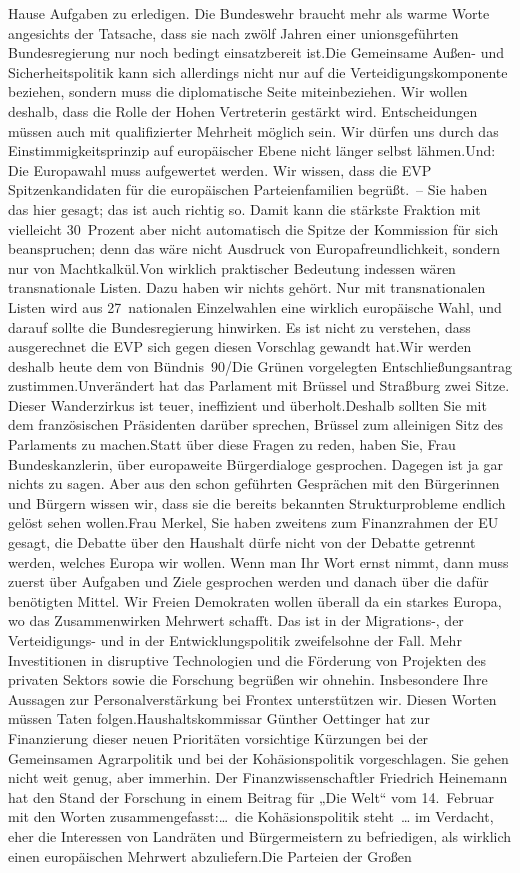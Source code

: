 \documentclass{article}
\begin{document}
Hause Aufgaben zu erledigen. Die Bundeswehr braucht mehr als warme Worte angesichts der Tatsache, dass sie nach zwölf Jahren einer unionsgeführten Bundesregierung nur noch bedingt einsatzbereit ist.Die Gemeinsame Außen- und Sicherheitspolitik kann sich allerdings nicht nur auf die Verteidigungskomponente beziehen, sondern muss die diplomatische Seite miteinbeziehen. Wir wollen deshalb, dass die Rolle der Hohen Vertreterin gestärkt wird. Entscheidungen müssen auch mit qualifizierter Mehrheit möglich sein. Wir dürfen uns durch das Einstimmigkeitsprinzip auf europäischer Ebene nicht länger selbst lähmen.Und: Die Europawahl muss aufgewertet werden. Wir wissen, dass die EVP Spitzenkandidaten für die europäischen Parteienfamilien begrüßt. – Sie haben das hier gesagt; das ist auch richtig so. Damit kann die stärkste Fraktion mit vielleicht 30 Prozent aber nicht automatisch die Spitze der Kommission für sich beanspruchen; denn das wäre nicht Ausdruck von Europafreundlichkeit, sondern nur von Machtkalkül.Von wirklich praktischer Bedeutung indessen wären transnationale Listen. Dazu haben wir nichts gehört. Nur mit transnationalen Listen wird aus 27 nationalen Einzelwahlen eine wirklich europäische Wahl, und darauf sollte die Bundesregierung hinwirken. Es ist nicht zu verstehen, dass ausgerechnet die EVP sich gegen diesen Vorschlag gewandt hat.Wir werden deshalb heute dem von Bündnis 90/Die Grünen vorgelegten Entschließungsantrag zustimmen.Unverändert hat das Parlament mit Brüssel und Straßburg zwei Sitze. Dieser Wanderzirkus ist teuer, ineffizient und überholt.Deshalb sollten Sie mit dem französischen Präsidenten darüber sprechen, Brüssel zum alleinigen Sitz des Parlaments zu machen.Statt über diese Fragen zu reden, haben Sie, Frau Bundeskanzlerin, über europaweite Bürgerdialoge gesprochen. Dagegen ist ja gar nichts zu sagen. Aber aus den schon geführten Gesprächen mit den Bürgerinnen und Bürgern wissen wir, dass sie die bereits bekannten Strukturprobleme endlich gelöst sehen wollen.Frau Merkel, Sie haben zweitens zum Finanzrahmen der EU gesagt, die Debatte über den Haushalt dürfe nicht von der Debatte getrennt werden, welches Europa wir wollen. Wenn man Ihr Wort ernst nimmt, dann muss zuerst über Aufgaben und Ziele gesprochen werden und danach über die dafür benötigten Mittel. Wir Freien Demokraten wollen überall da ein starkes Europa, wo das Zusammenwirken Mehrwert schafft. Das ist in der Migrations-, der Verteidigungs- und in der Entwicklungspolitik zweifelsohne der Fall. Mehr Investitionen in disruptive Technologien und die Förderung von Projekten des privaten Sektors sowie die Forschung begrüßen wir ohnehin. Insbesondere Ihre Aussagen zur Personalverstärkung bei Frontex unterstützen wir. Diesen Worten müssen Taten folgen.Haushaltskommissar Günther Oettinger hat zur Finanzierung dieser neuen Prioritäten vorsichtige Kürzungen bei der Gemeinsamen Agrarpolitik und bei der Kohäsionspolitik vorgeschlagen. Sie gehen nicht weit genug, aber immerhin. Der Finanzwissenschaftler Friedrich Heinemann hat den Stand der Forschung in einem Beitrag für „Die Welt“ vom 14. Februar mit den Worten zusammengefasst:… die Kohäsionspolitik steht … im Verdacht, eher die Interessen von Landräten und Bürgermeistern zu befriedigen, als wirklich einen europäischen Mehrwert abzuliefern.Die Parteien der Großen 
\end{document}
